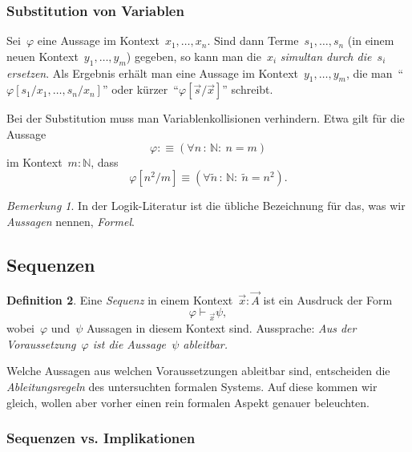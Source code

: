 \documentclass[a4paper,ngerman,12pt]{scrartcl}
\theoremstyle{definition}
\newtheorem{defn}{Definition}[section]
\theoremstyle{plain}
\theoremstyle{remark}
\newtheorem{bem}[defn]{Bemerkung}
\newcommand{\NN}{\mathbb{N}}
\newcommand{\seq}[1]{\mathrel{\vdash\!\!\!_{#1}}}
\renewcommand{\_}{\mathpunct{.}\,}
\newcommand{\?}{\,{:}\,}
\begin{document}
\subsubsection*{Substitution von Variablen}

Sei~$\varphi$ eine Aussage im Kontext~$x_1,\ldots,x_n$. Sind dann
Terme~$s_1,\ldots,s_n$ (in einem neuen Kontext~$y_1,\ldots,y_m$) gegeben, so
kann man die~$x_i$ \emph{simultan durch die~$s_i$ ersetzen}. Als Ergebnis
erhält man eine Aussage im Kontext~$y_1,\ldots,y_m$, die
man~"`$\varphi[s_1/x_1,\ldots,s_n/x_n]$"' oder kürzer~"`$\varphi[\vec s/\vec
x]$"' schreibt.

Bei der Substitution muss man Variablenkollisionen verhindern. Etwa gilt für
die Aussage
\[ \varphi :\equiv (\forall n\?\NN{:}\ n = m) \]
im Kontext~$m : \NN$, dass
\[ \varphi[n^2/m] \equiv (\forall \tilde n\?\NN{:}\ \tilde n = n^2). \]

\begin{bem}In der Logik-Literatur ist die übliche Bezeichnung für das, was wir \emph{Aussagen}
nennen, \emph{Formel}.\end{bem}


\subsection{Sequenzen}

\begin{defn}Eine \emph{Sequenz} in einem Kontext~$\vec x : \vec A$ ist ein
Ausdruck der Form
\[ \varphi \seq{\vec x} \psi, \]
wobei~$\varphi$ und~$\psi$ Aussagen in diesem Kontext sind. Aussprache:
\emph{Aus der Voraussetzung~$\varphi$ ist die Aussage~$\psi$ ableitbar.}
\end{defn}

Welche Aussagen aus welchen Voraussetzungen ableitbar sind, entscheiden die
\emph{Ableitungsregeln} des untersuchten formalen Systems. Auf diese kommen wir
gleich, wollen aber vorher einen rein formalen Aspekt genauer beleuchten.


\subsubsection*{Sequenzen vs. Implikationen}
\end{document}
